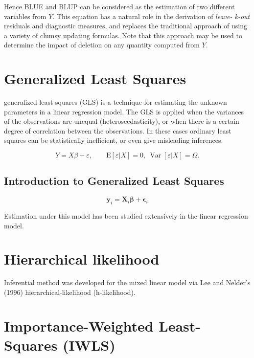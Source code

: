 \documentclass[12pt, a4paper]{article}
\begin{document}
Hence BLUE and BLUP can be considered as the estimation of two different variables from $Y$. This equation has a natural role in the derivation of \emph{leave- k-out} residuals and diagnostic measures, and replaces the traditional approach of using a variety of clumsy updating formulas. Note that this approach may be used to determine the impact of deletion on any quantity computed from $Y$.




\section{Generalized Least Squares}


generalized least squares (GLS) is a technique for estimating the unknown parameters in a linear regression model. 
The GLS is applied when the variances of the observations are unequal (heteroscedasticity), or when there is a certain degree of correlation between the observations. 
In these cases ordinary least squares can be statistically inefficient, or even give misleading inferences.



\[ Y = X\beta + \varepsilon, \qquad \mathrm{E}[\varepsilon|X]=0,\ \operatorname{Var}[\varepsilon|X]=\Omega.\]



\subsection{Introduction to Generalized Least Squares}
\begin{equation}
\boldsymbol{y}_i = \boldsymbol{X}_i\boldsymbol{\beta} + \boldsymbol{\epsilon}_i
\end{equation}



Estimation under this model has been studied extensively in the linear regression model.





\section{Hierarchical likelihood} %
Inferential method was developed for the mixed linear model via Lee and Nelder's (1996) hierarchical-likelihood (h-likelihood).

\section{Importance-Weighted Least-Squares (IWLS)}  %
\end{document}
